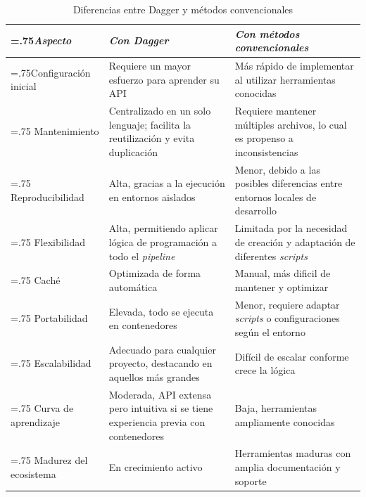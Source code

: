 \begin{table}[htbp]
  \begin{tabularx}{\textwidth}{|>{\hsize=.75\hsize}X|X|>{\hsize=1.25\hsize}X|}
    \hline
    \textit{Aspecto} & \textit{Con Dagger} & \textit{Con métodos convencionales} \\ \hline
    Configuración inicial & Requiere un mayor esfuerzo para aprender su API & Más rápido de implementar al utilizar herramientas conocidas \\ \hline
    Mantenimiento & Centralizado en un solo lenguaje; facilita la reutilización y evita duplicación & Requiere mantener múltiples archivos, lo cual es propenso a inconsistencias \\ \hline
    Reproducibilidad & Alta, gracias a la ejecución en entornos aislados & Menor, debido a las posibles diferencias entre entornos locales de desarrollo \\ \hline
    Flexibilidad & Alta, permitiendo aplicar lógica de programación a todo el \textit{pipeline} & Limitada por la necesidad de creación y adaptación de diferentes \textit{scripts} \\ \hline
    Caché & Optimizada de forma automática & Manual, más dificil de mantener y optimizar \\ \hline
    Portabilidad & Elevada, todo se ejecuta en contenedores & Menor, requiere adaptar \textit{scripts} o configuraciones según el entorno \\ \hline
    Escalabilidad & Adecuado para cualquier proyecto, destacando en aquellos más grandes & Difícil de escalar conforme crece la lógica \\ \hline
    Curva de aprendizaje & Moderada, API extensa pero intuitiva si se tiene experiencia previa con contenedores & Baja, herramientas ampliamente conocidas \\ \hline
    Madurez del ecosistema & En crecimiento activo & Herramientas maduras con amplia documentación y soporte \\ \hline
  \end{tabularx}
  \caption{Diferencias entre Dagger y métodos convencionales}
  \label{table:differences}
\end{table}
